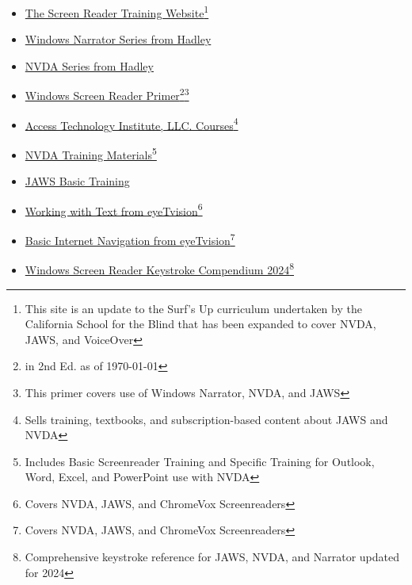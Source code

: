 \begin{itemize}
\begin{itemize}
 \item \href{https://srt.csb-cde.ca.gov/}{The Screen Reader Training Website}\footnote{\raggedright This site is an update to the Surf's Up curriculum undertaken by the California School for the Blind that has been expanded to cover NVDA, JAWS, and VoiceOver}
 \item \href{https://hadley.edu/workshops/windows-narrator-series}{Windows Narrator Series from Hadley}
 \item \href{https://hadley.edu/workshops/nvda-screen-reader-series}{NVDA Series from Hadley}
 \item \href{https://carroll.org/the-windows-screen-reader-primer-all-the-basics-and-more-second-edition/}{Windows Screen Reader Primer}\footnote{\raggedright in 2nd Ed. as of \today}\footnote{\raggedright This primer covers use of Windows Narrator, NVDA, and JAWS}
 \item \href{https://www.blind.training/}{Access Technology Institute, LLC. Courses}\footnote{\raggedright Sells training, textbooks, and subscription-based content about JAWS and NVDA}
 \item \href{https://www.nvaccess.org/product/nvda-productivity-bundle/}{NVDA Training Materials}\footnote{\raggedright Includes Basic Screenreader Training and Specific Training for Outlook, Word, Excel, and PowerPoint use with NVDA}
 \item \href{https://support.freedomscientific.com/Training/JAWS-Basic-Training.zip}{JAWS Basic Training}
 \item \href{https://eyetvision.org/screen-reader-curriculum-landing-page/\#wwt2}{Working with Text from eyeTvision}\footnote{\raggedright Covers NVDA, JAWS, and ChromeVox Screenreaders}
 \item \href{https://eyetvision.org/screen-reader-curriculum-landing-page/\#bin2}{Basic Internet Navigation from eyeTvision}\footnote{\raggedright Covers NVDA, JAWS, and ChromeVox Screenreaders}
 \item \href{https://shop.nbp.org/products/windows-screen-reader-keystroke-compendium-2024-update}{Windows Screen Reader Keystroke Compendium 2024}\footnote{\raggedright Comprehensive keystroke reference for JAWS, NVDA, and Narrator updated for 2024}
\end{itemize}


\end{itemize}
